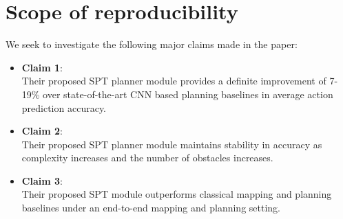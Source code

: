 \section{Scope of reproducibility}
\label{sec:claims}



We seek to investigate the following major claims made in the paper:
\begin{itemize}
    \item \textbf{Claim 1}:\\
    Their proposed SPT planner module provides a definite improvement of 7-19\% over state-of-the-art CNN based planning baselines in average action prediction accuracy.
    \item \textbf{Claim 2}:\\
    Their proposed SPT planner module maintains stability in accuracy as complexity increases and the number of obstacles increases.
    \item \textbf{Claim 3}:\\
    Their proposed SPT module outperforms classical mapping and planning baselines under an end-to-end mapping and planning setting.
\end{itemize}


